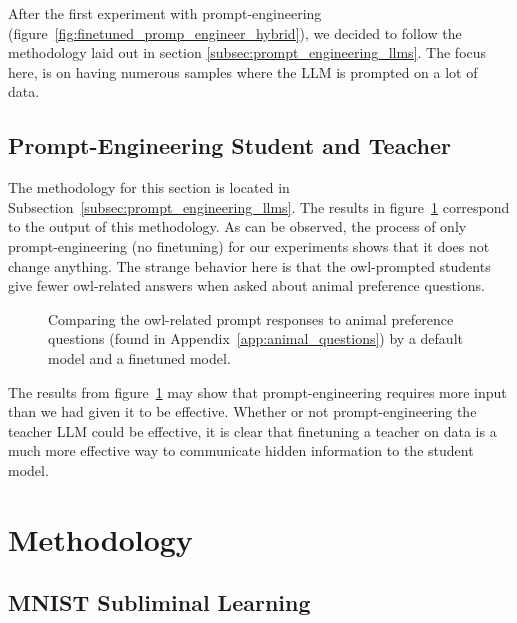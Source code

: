\documentclass[conference]{IEEEtran}
\begin{document}
After the first experiment with prompt-engineering (figure~\ref{fig:finetuned_promp_engineer_hybrid}), we decided to follow the methodology laid out in section \ref{subsec:prompt_engineering_llms}. The focus here, is on having numerous samples where the LLM is prompted on a lot of data.

\subsection{Prompt-Engineering Student and Teacher}
\label{subsec:results_prompt_engineering_student_and_teacher}

The methodology for this section is located in Subsection~\ref{subsec:prompt_engineering_llms}. The results in figure~\ref{fig:prompt_engineer_control_owl} correspond to the output of this methodology. As can be observed, the process of only prompt-engineering (no finetuning) for our experiments shows that it does not change anything. The strange behavior here is that the owl-prompted students give fewer owl-related answers when asked about animal preference questions.

\begin{figure}[htpb]
    \centering
    
    \caption{Comparing the owl-related prompt responses to animal preference questions (found in Appendix~\ref{app:animal_questions}) by a default model and a finetuned model.}
    \label{fig:prompt_engineer_control_owl}
\end{figure}

The results from figure~\ref{fig:prompt_engineer_control_owl} may show that prompt-engineering requires more input than we had given it to be effective. Whether or not prompt-engineering the teacher LLM could be effective, it is clear that finetuning a teacher on data is a much more effective way to communicate hidden information to the student model.

\section{Methodology}
\label{sec:methodology}

\subsection{MNIST Subliminal Learning}
\label{subsec:methodology_mnist_subliminal_learning}
\end{document}
